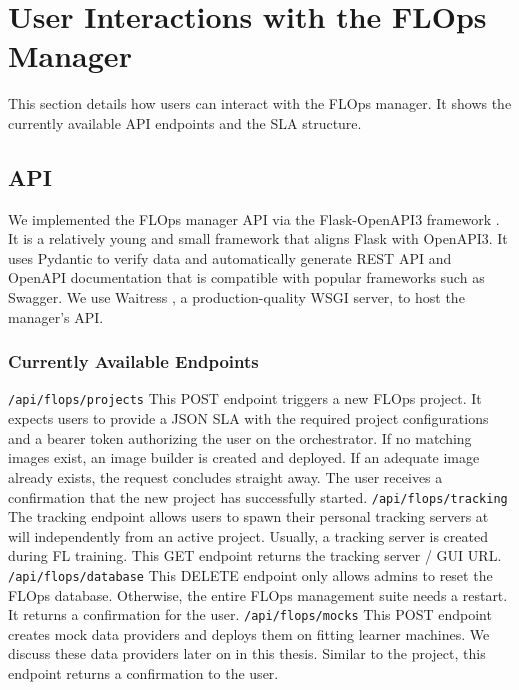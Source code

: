 \section{User Interactions with the FLOps Manager}
This section details how users can interact with the FLOps manager.
It shows the currently available API endpoints and the SLA structure.

\subsection{API} \label{subsection:api}
We implemented the FLOps manager API via the Flask-OpenAPI3 framework \cite{framework:flask_openapi3}.
It is a relatively young and small framework that aligns Flask with OpenAPI3.
It uses Pydantic to verify data and automatically generate REST API and OpenAPI documentation that is compatible with popular frameworks such as Swagger.
We use Waitress \cite{waitress}, a production-quality WSGI server, to host the manager's API.

\subsubsection{Currently Available Endpoints}
\texttt{/api/flops/projects}\newline
This POST endpoint triggers a new FLOps project.
It expects users to provide a JSON SLA with the required project configurations and a bearer token authorizing the user on the orchestrator.
If no matching images exist, an image builder is created and deployed.
If an adequate image already exists, the request concludes straight away.
The user receives a confirmation that the new project has successfully started.
\vspace{5mm}
\newline
\texttt{/api/flops/tracking}\newline
The tracking endpoint allows users to spawn their personal tracking servers at will independently from an active project.
Usually, a tracking server is created during FL training.
This GET endpoint returns the tracking server / GUI URL.
\vspace{5mm}
\newline
\texttt{/api/flops/database}\newline
This DELETE endpoint only allows admins to reset the FLOps database.
Otherwise, the entire FLOps management suite needs a restart.
It returns a confirmation for the user.
\vspace{5mm}
\newline
\texttt{/api/flops/mocks}\newline
This POST endpoint creates mock data providers and deploys them on fitting learner machines.
We discuss these data providers later on in this thesis.
Similar to the project, this endpoint returns a confirmation to the user.
\vspace{5mm}
\newline

